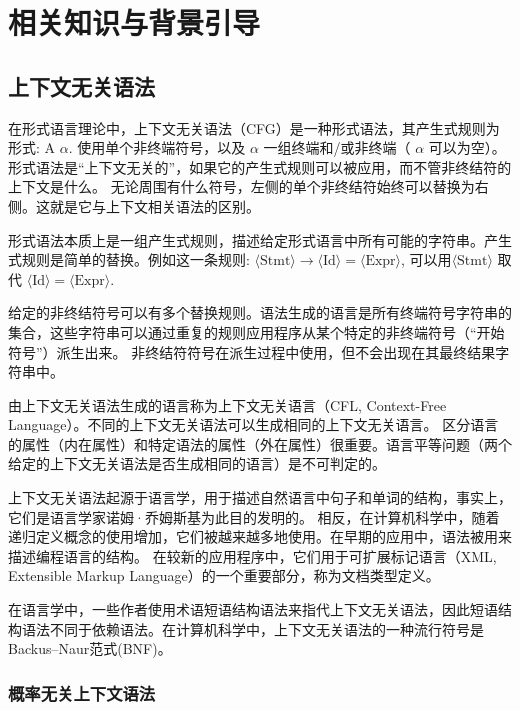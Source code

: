 
\chapter{相关知识与背景引导}


\section{上下文无关语法}

在形式语言理论中，上下文无关语法（CFG）是一种形式语法，其产生式规则为形式: A \rightarrow $\alpha$. 
使用单个非终端符号，以及 $\alpha$ 一组终端和/或非终端（ $\alpha$ 可以为空）。
形式语法是“上下文无关的”，如果它的产生式规则可以被应用，而不管非终结符的上下文是什么。
无论周围有什么符号，左侧的单个非终结符始终可以替换为右侧。这就是它与上下文相关语法的区别。

形式语法本质上是一组产生式规则，描述给定形式语言中所有可能的字符串。产生式规则是简单的替换。例如这一条规则: $\displaystyle \langle {\text{Stmt}}\rangle \to \langle {\text{Id}}\rangle =\langle {\text{Expr}}\rangle$, 
可以用$\displaystyle \langle {\text{Stmt}}\rangle$ 取代 $\langle {\text{Id}}\rangle =\langle {\text{Expr}}\rangle$.

给定的非终结符号可以有多个替换规则。语法生成的语言是所有终端符号字符串的集合，这些字符串可以通过重复的规则应用程序从某个特定的非终端符号（“开始符号”）派生出来。
非终结符符号在派生过程中使用，但不会出现在其最终结果字符串中。

由上下文无关语法生成的语言称为上下文无关语言（CFL, Context-Free Language）。不同的上下文无关语法可以生成相同的上下文无关语言。
区分语言的属性（内在属性）和特定语法的属性（外在属性）很重要。语言平等问题（两个给定的上下文无关语法是否生成相同的语言）是不可判定的。

上下文无关语法起源于语言学，用于描述自然语言中句子和单词的结构，事实上，它们是语言学家诺姆·乔姆斯基为此目的发明的。
相反，在计算机科学中，随着递归定义概念的使用增加，它们被越来越多地使用。在早期的应用中，语法被用来描述编程语言的结构。
在较新的应用程序中，它们用于可扩展标记语言（XML,  Extensible Markup Language）的一个重要部分，称为文档类型定义\cite{hopcroft2001introduction}。

在语言学中，一些作者使用术语短语结构语法来指代上下文无关语法，因此短语结构语法不同于依赖语法。在计算机科学中，上下文无关语法的一种流行符号是Backus–Naur范式(BNF)。

\subsection{概率无关上下文语法}

